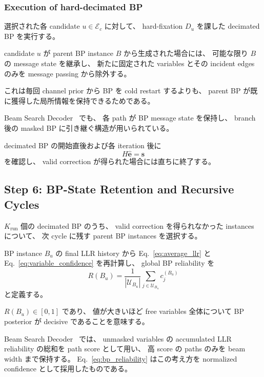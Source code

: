 \subsubsection{Execution of hard-decimated BP}

選択された各 candidate $u\in\mathcal{E}_c$ に対して、
hard-fixation $D_u$ を課した decimated BP を実行する。

candidate $u$ が parent BP instance $B$ から生成された場合には、
可能な限り $B$ の message state を継承し、
新たに固定された variables とその incident edges のみを
message passing から除外する。

これは毎回 channel prior から BP を cold restart するよりも、
parent BP が既に獲得した局所情報を保持できるためである。

Beam Search Decoder~\cite{beamsearch} でも、
各 path が BP message state を保持し、
branch 後の masked BP に引き継ぐ構造が用いられている。

decimated BP の開始直後および各 iteration 後に
\begin{equation}
    H\hat{\bm e}=\bm{s}
\end{equation}
を確認し、
valid correction が得られた場合には直ちに終了する。


\subsection{Step 6: BP-State Retention and Recursive Cycles}

$K_{\mathrm{run}}$ 個の decimated BP のうち、
valid correction を得られなかった instances について、
次 cycle に残す parent BP instances を選択する。

BP instance $B_u$ の final LLR history から
Eq.~\eqref{eq:average_llr} と
Eq.~\eqref{eq:variable_confidence} を再計算し、
global BP reliability を
\begin{equation}
    \boxed{
    R(B_u)
    =
    \frac{1}{
        |\mathcal{U}_{B_u}|
    }
    \sum_{j\in\mathcal{U}_{B_u}}
    c_j^{(B_u)}
    }
    \label{eq:bp_reliability}
\end{equation}
と定義する。

$R(B_u)\in[0,1]$ であり、
値が大きいほど free variables 全体について
BP posterior が decisive であることを意味する。

Beam Search Decoder~\cite{beamsearch} では、
unmasked variables の accumulated LLR reliability の総和を
path score として用い、
高 score の paths のみを beam width まで保持する。
Eq.~\eqref{eq:bp_reliability} はこの考え方を
normalized confidence として採用したものである。

